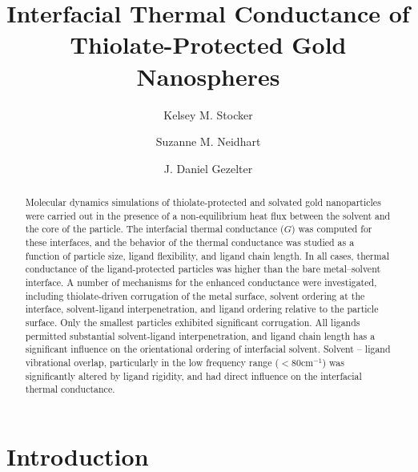 \documentclass[aps,jcp,preprint,showpacs,superscriptaddress,groupedaddress]{revtex4-1}  %
\begin{document}
\title{Interfacial Thermal Conductance of Thiolate-Protected
  Gold Nanospheres}
\author{Kelsey M. Stocker}
\author{Suzanne M. Neidhart}
\author{J. Daniel Gezelter}

\begin{abstract}
  Molecular dynamics simulations of thiolate-protected and solvated
  gold nanoparticles were carried out in the presence of a
  non-equilibrium heat flux between the solvent and the core of the
  particle. The interfacial thermal conductance ($G$) was computed for
  these interfaces, and the behavior of the thermal conductance was
  studied as a function of particle size, ligand flexibility, and
  ligand chain length. In all cases, thermal conductance of the
  ligand-protected particles was higher than the bare metal--solvent
  interface.  A number of mechanisms for the enhanced conductance were
  investigated, including thiolate-driven corrugation of the metal
  surface, solvent ordering at the interface, solvent-ligand
  interpenetration, and ligand ordering relative to the particle
  surface. Only the smallest particles exhibited significant
  corrugation.  All ligands permitted substantial solvent-ligand
  interpenetration, and ligand chain length has a significant
  influence on the orientational ordering of interfacial solvent.
  Solvent -- ligand vibrational overlap, particularly in the low
  frequency range ($< 80 \mathrm{cm}^{-1}$) was significantly altered
  by ligand rigidity, and had direct influence on the interfacial
  thermal conductance.
\end{abstract}

\pacs{}
\keywords{}
\maketitle

\section{Introduction}
\end{document}
